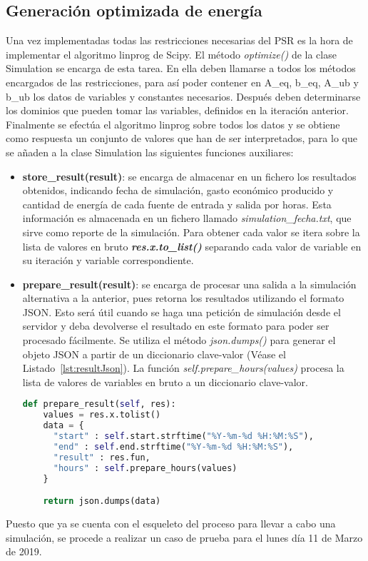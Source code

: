 \subsection{Generación optimizada de energía}
Una vez implementadas todas las restricciones necesarias del PSR es la hora de implementar el algoritmo linprog de Scipy. El método \textit{optimize()} de la clase Simulation se encarga de esta tarea. En ella deben llamarse a todos los métodos encargados de las restricciones, para así poder contener en A\_eq, b\_eq, A\_ub y b\_ub los datos de variables y constantes necesarios. Después deben determinarse los dominios que pueden tomar las variables, definidos en la iteración anterior. Finalmente se efectúa el algoritmo linprog sobre todos los datos y se obtiene como respuesta un conjunto de valores que han de ser interpretados, para lo que se añaden a la clase Simulation las siguientes funciones auxiliares:
\begin{itemize}
\item \textbf{store\_result(result)}: se encarga de almacenar en un fichero los resultados obtenidos, indicando fecha de simulación, gasto económico producido y cantidad de energía de cada fuente de entrada y salida por horas. Esta información es almacenada en un fichero llamado \textit{simulation\_fecha.txt}, que sirve como reporte de la simulación. Para obtener cada valor se itera sobre la lista de valores en bruto \textbf{\textit{res.x.to\_list()}} separando cada valor de variable en su iteración y variable correspondiente.
\item \textbf{prepare\_result(result)}: se encarga de procesar una salida a la simulación alternativa a la anterior, pues retorna los resultados utilizando el formato \gls{JSON}. Esto será útil cuando se haga una petición de simulación desde el servidor y deba devolverse el resultado en este formato para poder ser procesado fácilmente. Se utiliza el método \textit{json.dumps()} para generar el objeto \gls{JSON} a partir de un diccionario clave-valor (Véase el Listado~\ref{lst:resultJson}). La función \textit{self.prepare\_hours(values)} procesa la lista de valores de variables en bruto a un diccionario clave-valor.
\begin{lstlisting}[language=Python,float=ht,caption={Función de procesamiento del resultado a formato json},label={lst:resultJson}]
def prepare_result(self, res):
    values = res.x.tolist()
    data = {
      "start" : self.start.strftime("%Y-%m-%d %H:%M:%S"),
      "end" : self.end.strftime("%Y-%m-%d %H:%M:%S"),
      "result" : res.fun,
      "hours" : self.prepare_hours(values)
    }

    return json.dumps(data)
\end{lstlisting}
\end{itemize}
Puesto que ya se cuenta con el esqueleto del proceso para llevar a cabo una simulación, se procede a realizar un caso de prueba para el lunes día 11 de Marzo de 2019.
